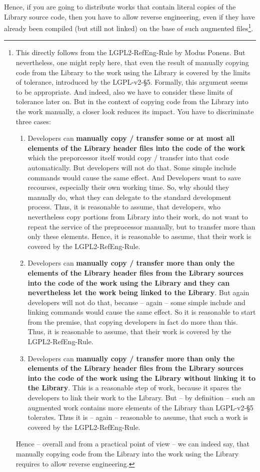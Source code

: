 Hence, if you are going to distribute works that contain literal copies of the
Library source code, then you have to allow reverse engineering, even if they
have already been compiled (but still not linked) on the base of such augmented
files\footnote{This directly follows from the LGPL2-RefEng-Rule by Modus Ponens.
But nevertheless, one might reply here, that even the result of manually copying
code from the Library to the work using the Library is covered by the limits of
tolerance, introduced by the LGPL-v2-§5. Formally, this argument seems to be
appropriate. And indeed, also we have to consider these limits of
tolerance later on. But in the context of copying code from the Library into the
work manually, a closer look reduces its impact. You have to discriminate three
cases:
\begin{enumerate}
  \item Developers can  \textbf{manually copy / transfer some or at most all
  elements of the Library header files into the code of the work} which the
  preporcessor itself would copy / transfer into that code automatically. But
  developers will not do that. Some simple include commands would cause the same
  effect. And Developers want to save recourses, especially their own working
  time. So, why should they manually do, what they can delegate to the standard
  development process. Thus, it is reasonable to assume, that developers, who
  nevertheless copy portions from Library into their work, do not want to repeat
  the service of the preprocessor manually, but to transfer more than only these
  elements. Hence, it is reasonable to assume, that their work is covered by the
  LGPL2-RefEng-Rule.
  \item Developers can \textbf{manually copy / transfer more than only the
  elements of the Library header files from the Library sources into the code of
  the work using the Library and they can nevertheless let the work being linked
  to the Library}. But again developers will not do that, because -- again --
  some simple include and linking commands would cause the same effect. So it is
  reasonable to start from the premise, that copying developers in fact do more
  than this. Thus, it is reasonable to assume, that their work is covered by the
  LGPL2-RefEng-Rule.
  \item Developers can \textbf{manually copy / transfer more than only the
  elements of the Library header files from the Library sources into the code of
  the work using the Library without linking it to the Library}. This is a
  reasonable step of work, because it spares the developers to link their work
  to the Library. But -- by definition -- such an augmented work contains more elements
  of the Library than LGPL-v2-§5 tolerates. Thus it is -- again -- reasonable to
  assume, that such a work is covered by the LGPL2-RefEng-Rule.
\end{enumerate}
Hence -- overall and from a practical point of view -- we can indeed say, that
manually copying code from the Library into the work using the Library
requires to allow reverse engineering.}.


